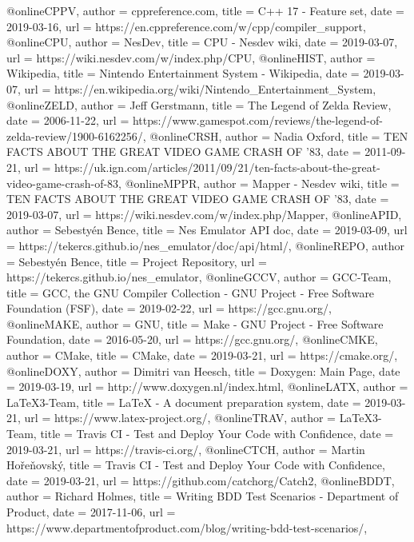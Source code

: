 @online{CPPV,
	author = {cppreference.com},
	title = {C++ 17 - Feature set},
	date = {2019-03-16},
	url = {https://en.cppreference.com/w/cpp/compiler_support},
}
@online{CPU,
	author = {NesDev},
	title = {CPU - Nesdev wiki},
	date = {2019-03-07},
	url = {https://wiki.nesdev.com/w/index.php/CPU},
}
@online{HIST,
	author = {Wikipedia},
	title = {Nintendo Entertainment System - Wikipedia},
	date = {2019-03-07},
	url = {https://en.wikipedia.org/wiki/Nintendo_Entertainment_System},
}
@online{ZELD,
	author = {Jeff Gerstmann},
	title = {The Legend of Zelda Review},
	date = {2006-11-22},
	url = {https://www.gamespot.com/reviews/the-legend-of-zelda-review/1900-6162256/},
}
@online{CRSH,
	author = {Nadia Oxford},
	title = {TEN FACTS ABOUT THE GREAT VIDEO GAME CRASH OF '83},
	date = {2011-09-21},
	url = {https://uk.ign.com/articles/2011/09/21/ten-facts-about-the-great-video-game-crash-of-83},
}
@online{MPPR,
	author = {Mapper - Nesdev wiki},
	title = {TEN FACTS ABOUT THE GREAT VIDEO GAME CRASH OF '83},
	date = {2019-03-07},
	url = {https://wiki.nesdev.com/w/index.php/Mapper},
}
@online{APID,
	author = {Sebestyén Bence},
	title = {Nes Emulator API doc},
	date = {2019-03-09},
	url = {https://tekercs.github.io/nes_emulator/doc/api/html/},
}
@online{REPO,
	author = {Sebestyén Bence},
	title = {Project Repository},
	url = {https://tekercs.github.io/nes_emulator},
}
@online{GCCV,
	author = {GCC-Team},
	title = {GCC, the GNU Compiler Collection - GNU Project - Free Software Foundation (FSF)},
	date = {2019-02-22},
	url = {https://gcc.gnu.org/},
}
@online{MAKE,
	author = {GNU},
	title = {Make - GNU Project - Free Software Foundation},
	date = {2016-05-20},
	url = {https://gcc.gnu.org/},
}
@online{CMKE,
	author = {CMake},
	title = {CMake},
	date = {2019-03-21},
	url = {https://cmake.org/},
}
@online{DOXY,
	author = {Dimitri van Heesch},
	title = {Doxygen: Main Page},
	date = {2019-03-19},
	url = {http://www.doxygen.nl/index.html},
}
@online{LATX,
	author = {LaTeX3-Team},
	title = {LaTeX - A document preparation system},
	date = {2019-03-21},
	url = {https://www.latex-project.org/},
}
@online{TRAV,
	author = {LaTeX3-Team},
	title = {Travis CI - Test and Deploy Your Code with Confidence},
	date = {2019-03-21},
	url = {https://travis-ci.org/},
}
@online{CTCH,
	author = {Martin Hořeňovský},
	title = {Travis CI - Test and Deploy Your Code with Confidence},
	date = {2019-03-21},
	url = {https://github.com/catchorg/Catch2},
}
@online{BDDT,
	author = {Richard Holmes},
	title = {Writing BDD Test Scenarios - Department of Product},
	date = {2017-11-06},
	url = {https://www.departmentofproduct.com/blog/writing-bdd-test-scenarios/},
}

